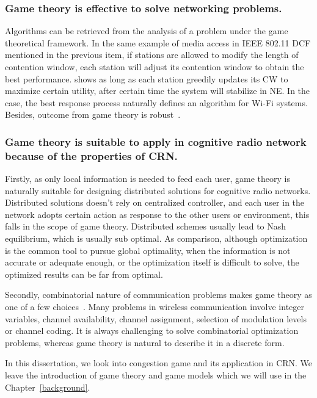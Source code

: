 \subsubsection*{Game theory is effective to solve networking problems.}
Algorithms can be retrieved from the analysis of a problem under the game theoretical framework.
In the same example of media access in IEEE 802.11 DCF mentioned in the previous item, if stations are allowed to modify the length of contention window, each station will adjust its contention window to obtain the best performance.
\cite{contentiongame_07} shows as long as each station greedily updates its CW to maximize certain utility, after certain time the system will stabilize in NE. 
In the case, the best response process naturally defines an algorithm for Wi-Fi systems.
%
Besides, outcome from game theory is robust~\cite{Han:2008:RAW:1457343}.


\subsubsection*{Game theory is suitable to apply in cognitive radio network because of the properties of CRN.}
Firstly, as only local information is needed to feed each user, game theory is naturally suitable for designing distributed solutions for cognitive radio networks.
Distributed solutions doesn't rely on centralized controller, and each user in the network adopts certain action as response to the other users or environment, this falls in the scope of game theory.
Distributed schemes usually lead to Nash equilibrium, which is usually sub optimal.
As comparison, although optimization is the common tool to pursue global optimality, when the information is not accurate or adequate enough, or the optimization itself is difficult to solve, the optimized results can be far from optimal.

%
Secondly, combinatorial nature of communication problems makes game theory as one of a few choices~\cite{Han:2008:RAW:1457343}.
Many problems in wireless communication involve integer variables, \ie channel availability, channel assignment, selection of modulation levels or channel coding.
It is always challenging to solve combinatorial optimization problems, whereas game theory is natural to describe it in a discrete form.


In this dissertation, we look into congestion game and its application in CRN.
We leave the introduction of game theory and game models which we will use in the Chapter~\ref{background}.






